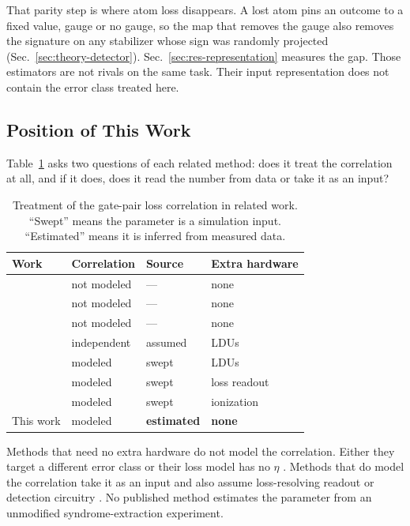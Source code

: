 \documentclass{ieeeaccess}
\begin{document}
That parity step is where atom loss disappears. A lost atom pins an outcome
to a fixed value, gauge or no gauge, so the map that removes the gauge also
removes the signature on any stabilizer whose sign was randomly projected
(Sec.~\ref{sec:theory-detector}). Sec.~\ref{sec:res-representation} measures
the gap. Those estimators are not rivals on the same task. Their input
representation does not contain the error class treated here.

\subsection{Position of This Work}
\label{sec:rel-position}

Table~\ref{tab:priorwork} asks two questions of each related method: does it
treat the correlation at all, and if it does, does it read the number from
data or take it as an input?

\begin{table}[!t]
\caption{Treatment of the gate-pair loss correlation in related work.
``Swept'' means the parameter is a simulation input. ``Estimated'' means it
is inferred from measured data.}
\label{tab:priorwork}
\centering
\begin{tabular}{@{}llll@{}}
\toprule
Work & Correlation & Source & Extra hardware \\
\midrule
\cite{spitz2018adaptiveweight,blumekohout2025detectorerrormodels} & not modeled & --- & none \\
\cite{hockings2025aces} & not modeled & --- & none \\
\cite{wang2026aiqubitloss} & not modeled & --- & none \\
\cite{perrin2025qecatomloss} & independent & assumed & LDUs \\
\cite{perrin2026correlatedloss} & modeled & swept & LDUs \\
\cite{liu2026optimaldistanceatomloss} & modeled & swept & loss readout \\
\cite{pecorari2026lossbiased} & modeled & swept & ionization \\
\midrule
This work & modeled & \textbf{estimated} & \textbf{none} \\
\bottomrule
\end{tabular}
\end{table}

Methods that need no extra hardware do not model the correlation. Either they
target a different error class
\cite{spitz2018adaptiveweight,blumekohout2025detectorerrormodels,hockings2025aces}
or their loss model has no $\eta$ \cite{wang2026aiqubitloss}. Methods that do
model the correlation take it as an input and also assume loss-resolving
readout or detection circuitry
\cite{perrin2026correlatedloss,liu2026optimaldistanceatomloss,pecorari2026lossbiased}.
No published method estimates the parameter from an unmodified
syndrome-extraction experiment.
\end{document}
